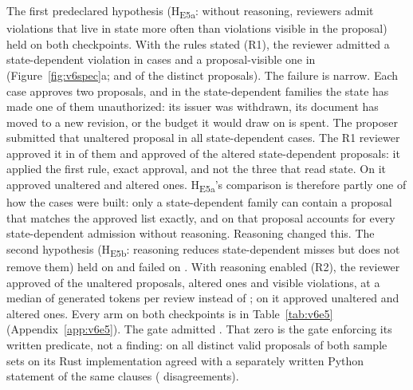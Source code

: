 The first predeclared hypothesis (H\textsubscript{E5a}: without reasoning, reviewers admit violations
that live in state more often than violations visible in the proposal) held on both checkpoints. With the rules stated
(R1), the \vsixEFiveCkpt{} reviewer admitted a state-dependent violation in \vsixReviewerStateCases{} cases and a
proposal-visible one in \vsixReviewerVisibleCases{} (Figure~\ref{fig:v6spec}a; \vsixReviewerState{} and
\vsixReviewerVisible{} of the distinct proposals). The failure is narrow. Each case approves two proposals, and in the
state-dependent families the state has made one of them unauthorized: its issuer was withdrawn, its document has moved
to a new revision, or the budget it would draw on is spent. The proposer submitted that unaltered proposal in all
\vsixExactCases{} state-dependent cases. The R1 reviewer approved it in \vsixReviewerExact{} of them and approved
\vsixReviewerMutated{} of the altered state-dependent proposals: it applied the first rule, exact approval, and not the
three that read state. On \vsixOtherCkpt{} it approved \vsixReviewerExactOther{} unaltered and
\vsixReviewerMutatedOther{} altered ones. H\textsubscript{E5a}'s comparison is therefore partly one of how the cases were
built: only a state-dependent family can contain a proposal that matches the approved list exactly, and on
\vsixEFiveCkpt{} that proposal accounts for every state-dependent admission without reasoning. Reasoning changed this. The second hypothesis (H\textsubscript{E5b}: reasoning
reduces state-dependent misses but does not remove them) held on \vsixOtherCkpt{} and failed on \vsixEFiveCkpt. With
reasoning enabled (R2), the \vsixEFiveCkpt{} reviewer approved \vsixReasonerExact{} of the unaltered proposals,
\vsixReasonerMutated{} altered ones and \vsixReasonerVisible{} visible violations, at a median of \vsixReasonerTokens{}
generated tokens per review instead of \vsixReviewerTokens; on \vsixOtherCkpt{} it approved
\vsixReasonerExactOther{} unaltered and \vsixReasonerMutatedOther{} altered ones. Every arm on both checkpoints is in
Table~\ref{tab:v6e5} (Appendix~\ref{app:v6e5}). The gate admitted \vsixGateBreaches{}. That zero is the gate enforcing
its written predicate, not a finding: on all \vsixGateUnique{} distinct valid proposals of both sample sets on
\vsixEFiveCkpt{} its Rust implementation agreed
with a separately written Python statement of the same clauses (\vsixMirrorDisagreements{} disagreements).
\vsixGateReplaySentence

